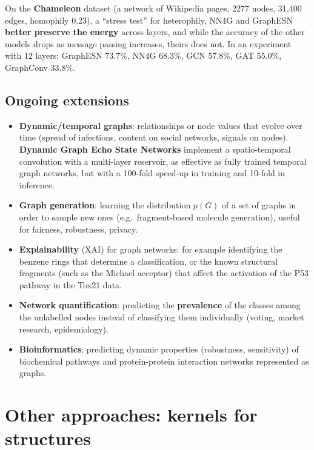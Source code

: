 On the \textbf{Chameleon} dataset (a network of Wikipedia pages, 2277
nodes, 31,400 edges, homophily 0.23), a ``stress test'' for
heterophily, NN4G and GraphESN \textbf{better preserve the energy}
across layers, and while the accuracy of the other models drops as
message passing increases, theirs does not. In an experiment with 12
layers: GraphESN 73.7\%, NN4G 68.3\%, GCN 57.8\%, GAT 55.0\%, GraphConv
33.8\%.

\subsection{Ongoing extensions}\label{estensioni-in-corso}

\begin{itemize}
\tightlist
\item
  \textbf{Dynamic/temporal graphs}: relationships or node values that
  evolve over time (spread of infections, content on social networks,
  signals on nodes). \textbf{Dynamic Graph Echo State Networks}
  implement a spatio-temporal convolution with a multi-layer reservoir,
  as effective as fully trained temporal graph networks, but with a
  100-fold speed-up in training and 10-fold in inference.
\item
  \textbf{Graph generation}: learning the distribution \(p(G)\) of a
  set of graphs in order to sample new ones (e.g.\ fragment-based
  molecule generation), useful for fairness, robustness, privacy.
\item
  \textbf{Explainability} (XAI) for graph networks: for example
  identifying the benzene rings that determine a classification, or the
  known structural fragments (such as the Michael acceptor) that affect
  the activation of the P53 pathway in the Tox21 data.
\item
  \textbf{Network quantification}: predicting the \textbf{prevalence}
  of the classes among the unlabelled nodes instead of classifying them
  individually (voting, market research, epidemiology).
\item
  \textbf{Bioinformatics}: predicting dynamic properties (robustness,
  sensitivity) of biochemical pathways and protein-protein interaction
  networks represented as graphs.
\end{itemize}

\section{Other approaches: kernels for
structures}\label{altri-approcci-i-kernel-per-strutture}


